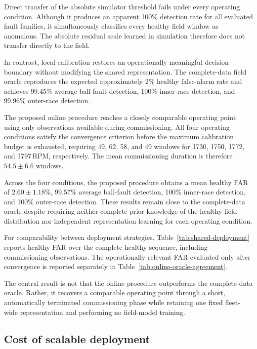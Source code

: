 \documentclass[numbered]{trbunofficial}
\begin{document}
Direct transfer of the absolute simulator threshold fails under every
operating condition. Although it produces an apparent 100\% detection rate
for all evaluated fault families, it simultaneously classifies every healthy
field window as anomalous. The absolute residual scale learned in simulation
therefore does not transfer directly to the field.

In contrast, local calibration restores an operationally meaningful decision
boundary without modifying the shared representation. The complete-data
field oracle reproduces the expected approximately 2\% healthy false-alarm
rate and achieves 99.45\% average ball-fault detection, 100\% inner-race
detection, and 99.96\% outer-race detection.

The proposed online procedure reaches a closely comparable operating point
using only observations available during commissioning. All four operating
conditions satisfy the convergence criterion before the maximum calibration
budget is exhausted, requiring 49, 62, 58, and 49 windows for 1730, 1750,
1772, and 1797\,RPM, respectively. The mean commissioning duration is
therefore $54.5 \pm 6.6$ windows.

Across the four conditions, the proposed procedure obtains a mean healthy FAR
of $2.60 \pm 1.18$\%, 99.57\% average ball-fault detection, 100\%
inner-race detection, and 100\% outer-race detection. These results remain
close to the complete-data oracle despite requiring neither complete prior
knowledge of the healthy field distribution nor independent representation
learning for each operating condition.

For comparability between deployment strategies,
Table~\ref{tab:shared-deployment} reports healthy FAR over the complete
healthy sequence, including commissioning observations. The operationally
relevant FAR evaluated only after convergence is reported separately in
Table~\ref{tab:online-oracle-agreement}.

The central result is not that the online procedure outperforms the
complete-data oracle. Rather, it recovers a comparable operating point
through a short, automatically terminated commissioning phase while retaining
one fixed fleet-wide representation and performing no field-model training.

\subsection{Cost of scalable deployment}
\label{sec:deployment-cost}
\end{document}

